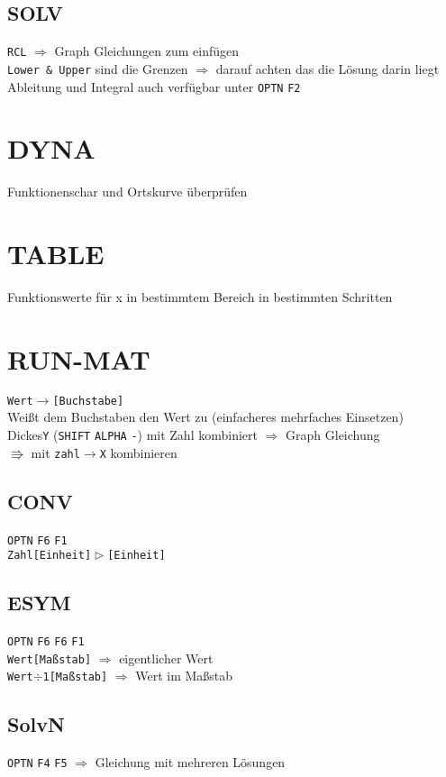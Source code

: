 \documentclass[12pt,a4paper,landscape]{article}
\def\g#1{\texttt{#1}}
\begin{document}
	\subsection{SOLV}
	 \g{RCL} $\Rightarrow$ Graph Gleichungen zum einfügen\\
	 \g{Lower \& Upper} sind die Grenzen $\Rightarrow$ darauf achten das die Lösung darin liegt\\
	 Ableitung und Integral auch verfügbar unter \g{OPTN} \g{F2}
	 \pagebreak
	 
	 
	 \section{DYNA}
	 Funktionenschar und Ortskurve \"uberpr\"ufen
	 \pagebreak
	 
	 
	 \section{TABLE}
	 Funktionswerte für x in bestimmtem Bereich in bestimmten Schritten
	 \pagebreak
	 
	 
	 \section{RUN-MAT}
	 \g{Wert$\rightarrow$[Buchstabe]}\\
	 Weißt dem Buchstaben den Wert zu (einfacheres mehrfaches Einsetzen)\\
	 \glqq Dickes\grqq \space \g{Y} (\g{SHIFT} \g{ALPHA} \g{-}) mit Zahl kombiniert $\Rightarrow$ Graph Gleichung\\
	 $ \Rrightarrow $ mit \g{zahl$\rightarrow$X} kombinieren\\
	 
	 \subsection{CONV}
	 \g{OPTN} \g{F6} \g{F1}\\
	 \g{Zahl[Einheit]$ \vartriangleright $[Einheit]}
	 
	 \subsection{ESYM}
	 \g{OPTN} \g{F6} \g{F6} \g{F1}\\
	 \g{Wert[Maßstab]} $ \Rightarrow $ eigentlicher Wert\\
	 \g{Wert$\div$1[Maßstab]} $ \Rightarrow $ Wert im Maßstab
	 
	 \subsection{SolvN}
	 \g{OPTN} \g{F4} \g{F5} $\Rightarrow$ Gleichung mit mehreren Lösungen
	 
\end{document}

